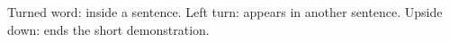 \documentclass{article}
\begin{document}
Turned word:  inside a sentence.
Left turn:  appears in another sentence.
Upside down:  ends the short demonstration.
\end{document}

